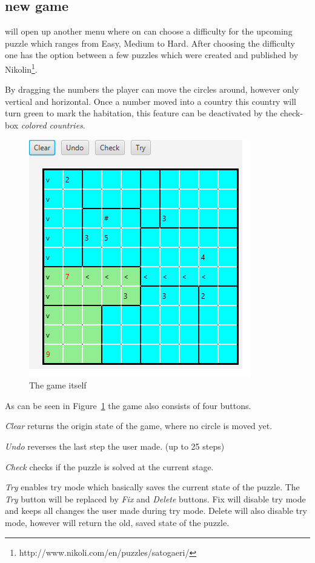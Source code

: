 \subsection{new game} will open up another menu where on can choose a difficulty for the upcoming puzzle which ranges from Easy, Medium to Hard. After choosing the difficulty one has the option between a few puzzles which were created and published by Nikolin\footnote{http://www.nikoli.com/en/puzzles/satogaeri/}.

By dragging the numbers the player can move the circles around, however only vertical and horizontal. Once a number moved into a country this country will turn green to mark the habitation, this feature can be deactivated by the check-box \emph{colored countries}.
\begin{figure}
  \centering
  \includegraphics[scale=1]{Pictures/game.png} 
  \caption{The game itself}
  \label{fig:game}
\end{figure}
As can be seen in Figure~\ref{fig:game} the game also consists of four buttons.

\emph{Clear} returns the origin state of the game, where no circle is moved yet.

\emph{Undo} reverses the last step the user made. (up to 25 steps)

\emph{Check} checks if the puzzle is solved at the current stage.

\emph{Try} enables try mode which basically saves the current state of the puzzle. The \emph{Try} button will be replaced by \emph{Fix} and \emph{Delete} buttons. Fix will disable try mode and keeps all changes the user made during try mode. Delete will also disable try mode, however will return the old, saved state of the puzzle.

